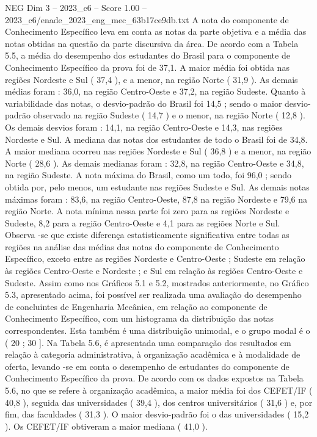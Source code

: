 \begin{textsample}{NEG Dim 3 – 2023\_c6 – Score 1.00 – 2023\_c6/enade\_2023\_eng\_mec\_63b17ce9db.txt}
A nota do componente de Conhecimento Específico leva em conta as notas da parte objetiva e a média das notas obtidas na questão da parte discursiva da área.
De acordo com a Tabela 5.5, a média do desempenho dos estudantes do Brasil para o componente de Conhecimento Específico da prova foi de 37,1.
A maior média foi obtida nas regiões Nordeste e Sul ( 37,4 ), e a menor, na região Norte ( 31,9 ).
As demais médias foram : 36,0, na região Centro-Oeste e 37,2, na região Sudeste.
Quanto à variabilidade das notas, o desvio-padrão do Brasil foi 14,5 ; sendo o maior desvio-padrão observado na região Sudeste ( 14,7 ) e o menor, na região Norte ( 12,8 ).
Os demais desvios foram : 14,1, na região Centro-Oeste e 14,3, nas regiões Nordeste e Sul.
A mediana das notas dos estudantes de todo o Brasil foi de 34,8.
A maior mediana ocorreu nas regiões Nordeste e Sul ( 36,8 ) e a menor, na região Norte ( 28,6 ).
As demais medianas foram : 32,8, na região Centro-Oeste e 34,8, na região Sudeste.
A nota máxima do Brasil, como um todo, foi 96,0 ; sendo obtida por, pelo menos, um estudante nas regiões Sudeste e Sul.
As demais notas máximas foram : 83,6, na região Centro-Oeste, 87,8 na região Nordeste e 79,6 na região Norte.
A nota mínima nessa parte foi zero para as regiões Nordeste e Sudeste, 8,2 para a região Centro-Oeste e 4,1 para as regiões Norte e Sul.
Observa -se que existe diferença estatisticamente significativa entre todas as regiões na análise das médias das notas do componente de Conhecimento Específico, exceto entre as regiões Nordeste e Centro-Oeste ; Sudeste em relação às regiões Centro-Oeste e Nordeste ; e Sul em relação às regiões Centro-Oeste e Sudeste.
Assim como nos Gráficos 5.1 e 5.2, mostrados anteriormente, no Gráfico 5.3, apresentado acima, foi possível ser realizada uma avaliação do desempenho de concluintes de Engenharia Mecânica, em relação ao componente de Conhecimento Específico, com um histograma da distribuição das notas correspondentes.
Esta também é uma distribuição unimodal, e o grupo modal é o ( 20 ; 30 ].
Na Tabela 5.6, é apresentada uma comparação dos resultados em relação à categoria administrativa, à organização acadêmica e à modalidade de oferta, levando -se em conta o desempenho de estudantes do componente de Conhecimento Específico da prova.
De acordo com os dados expostos na Tabela 5.6, no que se refere à organização acadêmica, a maior média foi dos CEFET/IF ( 40,8 ), seguida das universidades ( 39,4 ), dos centros universitários ( 31,6 ) e, por fim, das faculdades ( 31,3 ).
O maior desvio-padrão foi o das universidades ( 15,2 ).
Os CEFET/IF obtiveram a maior mediana ( 41,0 ).

\end{textsample}
